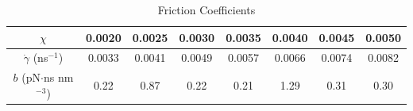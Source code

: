 \documentclass[lineno]{jfm}
\begin{document}
\begin{table}
\caption{Friction Coefficients}
\centering
\begin{tabular}{c c c c c c c c }
 $\chi$ & 0.0020   &  0.0025 &  0.0030 &  0.0035 &  0.0040 & 0.0045 & 0.0050  \\
\hline                    
$\dot\gamma$ (ns$^{-1}$)        & 0.0033 & 0.0041 & 0.0049 & 0.0057 & 0.0066 & 0.0074 & 0.0082\\
$b$ (pN$\cdot$ns nm$^{-3}$)    & 0.22 & 0.87  & 0.22 &0.21 & 1.29 & 0.31 & 0.30\\ 
\hline    
\end{tabular} 
\label{table1}
\end{table}
\end{document}

